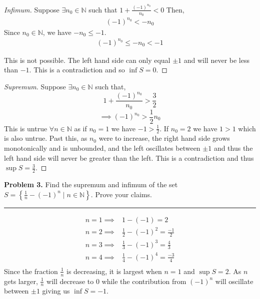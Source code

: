 \documentclass[leqno]{article}
\theoremstyle{nonumberplain}
\newtheorem{proof}{Proof}
\begin{document}
\begin{proof}[Infimum]
Suppose $\exists n_0 \in \mathbb{N}$ such that $1+\frac{(-1)^{n_0}}{n_0} < 0$  Then,
\begin{align*}
(-1)^{n_0} < -n_0
\end{align*}
Since $n_0 \in \mathbb{N}$, we have $-n_0 \leq -1$.  
\begin{align*}
(-1)^{n_0} \leq -n_0 < -1
\end{align*}

This is not possible. The left hand side can only equal $\pm 1$ and will never be less than $-1$. This is a contradiction and so $\inf S =0$.
\end{proof}

\begin{proof}[Supremum]
Suppose $\exists n_0 \in \mathbb{N}$ such that,
\[
1+\frac{(-1)^{n_0}}{n_0} > \frac{3}{2}
\]
\[
\implies (-1)^{n_0} > \frac{1}{2}n_0
\]
This is untrue $\forall n \in \mathbb{N}$ as if $n_0=1$ we have $-1 > \frac{1}{2}$.  If $n_0=2$ we have $1>1$ which is also untrue.  Past this, as $n_0$ were to increase, the right hand side grows monotonically and is unbounded, and the left oscillates between $\pm 1$ and thus the left hand side will never be greater than the left. This is a contradiction and thus $\sup S = \frac{3}{2}$.
\end{proof}

\pagebreak




\noindent\textbf{Problem 3.} Find the supremum and infimum of the set $S=\left\{\frac{1}{n} - (-1)^n \mid n\in \mathbb{N}\right\}$.  Prove your claims.

\noindent\rule[0.5ex]{\linewidth}{1pt}
\begin{equation*}
\begin{split}
n=1 \implies & 1-(-1)=2\\
n=2 \implies & \frac{1}{2}-(-1)^2=\frac{-1}{2}\\
n=3 \implies & \frac{1}{3}-(-1)^3 = \frac{4}{3}\\
n=4 \implies & \frac{1}{4}-(-1)^4 = \frac{-3}{4}\\
\end{split}
\end{equation*}
Since the fraction $\frac{1}{n}$ is decreasing, it is largest when $n=1$ and $\sup S =2$.  As $n$ gets larger, $\frac{1}{n}$ will decrease to $0$ while the contribution from $(-1)^n$ will oscillate between $\pm 1$ giving us $\inf S = -1$.
\end{document}
